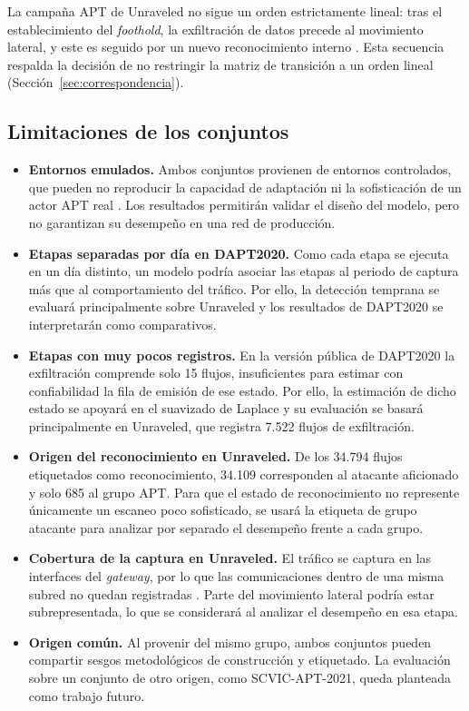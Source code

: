 La campaña APT de Unraveled no sigue un orden estrictamente lineal: tras el establecimiento del \textit{foothold}, la exfiltración de datos precede al movimiento lateral, y este es seguido por un nuevo reconocimiento interno \parencite{myneni2023unraveled}. Esta secuencia respalda la decisión de no restringir la matriz de transición a un orden lineal (Sección~\ref{sec:correspondencia}).

\subsection{Limitaciones de los conjuntos}
\begin{itemize}
    \item \textbf{Entornos emulados.} Ambos conjuntos provienen de entornos controlados, que pueden no reproducir la capacidad de adaptación ni la sofisticación de un actor APT real \parencite{mamun_limitations_2024}. Los resultados permitirán validar el diseño del modelo, pero no garantizan su desempeño en una red de producción.
    \item \textbf{Etapas separadas por día en DAPT2020.} Como cada etapa se ejecuta en un día distinto, un modelo podría asociar las etapas al periodo de captura más que al comportamiento del tráfico. Por ello, la detección temprana se evaluará principalmente sobre Unraveled y los resultados de DAPT2020 se interpretarán como comparativos.
    \item \textbf{Etapas con muy pocos registros.} En la versión pública de DAPT2020 la exfiltración comprende solo 15 flujos, insuficientes para estimar con confiabilidad la fila de emisión de ese estado. Por ello, la estimación de dicho estado se apoyará en el suavizado de Laplace y su evaluación se basará principalmente en Unraveled, que registra 7.522 flujos de exfiltración.
    \item \textbf{Origen del reconocimiento en Unraveled.} De los 34.794 flujos etiquetados como reconocimiento, 34.109 corresponden al atacante aficionado y solo 685 al grupo APT. Para que el estado de reconocimiento no represente únicamente un escaneo poco sofisticado, se usará la etiqueta de grupo atacante para analizar por separado el desempeño frente a cada grupo.
    \item \textbf{Cobertura de la captura en Unraveled.} El tráfico se captura en las interfaces del \textit{gateway}, por lo que las comunicaciones dentro de una misma subred no quedan registradas \parencite{myneni2023unraveled}. Parte del movimiento lateral podría estar subrepresentada, lo que se considerará al analizar el desempeño en esa etapa.
    \item \textbf{Origen común.} Al provenir del mismo grupo, ambos conjuntos pueden compartir sesgos metodológicos de construcción y etiquetado. La evaluación sobre un conjunto de otro origen, como SCVIC-APT-2021, queda planteada como trabajo futuro.
\end{itemize}

